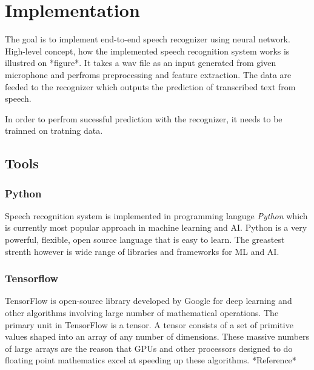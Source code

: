\chapter{Implementation}

The goal is to implement end-to-end speech recognizer using neural network.
High-level concept, how the implemented speech recognition system works is illustred on *figure*.
It takes a wav file as an input generated from given microphone and perfroms preprocessing and feature extraction.
The data are feeded to the recognizer which outputs the prediction of transcribed text from speech.


In order to perfrom sucessful prediction with the recognizer, it needs to be trainned on tratning data.


\section{Tools}

\subsection{Python}

Speech recognition system is implemented in programming languge \textit{Python} which is currently most popular approach in machine learning and AI.
Python is a very powerful, flexible, open source language that is easy to learn.
The greastest strenth however is wide range of libraries and frameworks for ML and AI.

\subsection{Tensorflow}


TensorFlow is open-source library developed by Google for deep learning and other algorithms involving large number of mathematical operations.
The primary unit in TensorFlow is a tensor.
A tensor consists of a set of primitive values shaped into an array of any number of dimensions.
These massive numbers of large arrays are the reason that GPUs and other processors designed to do floating point mathematics excel at speeding up these algorithms. *Reference*

